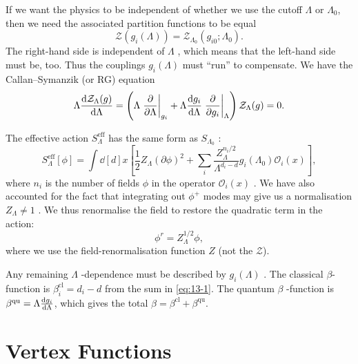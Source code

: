 If we want the physics to be independent of whether we use the cutoff $\Lambda$ or $\Lambda_0$, then we need the associated partition functions to be equal
\begin{equation}
  \mathcal{Z}(g_i (\Lambda)) = \mathcal{Z}_{\Lambda_0} (g_{i0}; \Lambda_0).
\end{equation}
The right-hand side is independent of $\Lambda$ , which means that the left-hand side must be, too.
Thus the couplings $g_i(\Lambda)$  must ``run'' to compensate.
We have the Callan--Symanzik (or RG) equation
\begin{equation}
  \Lambda \dv{\mathcal{Z}_\Lambda(g)}{\Lambda} = \left( \Lambda \left.\frac{\partial }{\partial \Lambda}\right\rvert_{g_i} + \Lambda \dv{g_i}{\Lambda} \left.\frac{\partial }{\partial g_i}\right\rvert_{\Lambda} \right) \mathcal{Z}_\Lambda (g) = 0.
\end{equation}

The effective action $S_\Lambda^{\text{eff}}$  has the same form as $S_{\Lambda_0}$ :
\begin{equation}
  \label{eq:13-1}
  S_\Lambda^{ \text{eff}} [\phi] = \int \dd[d]{x} \left[ \frac{1}{2} Z_\Lambda (\partial \phi)^2 + \sum_{i} \frac{Z_\Lambda^{n_i / 2}}{\Lambda^{d_i - d}} g_i(\Lambda_0) \mathcal{O}_i(x) \right],
\end{equation}
where $n_i$  is the number of fields $\phi$  in the operator $\mathcal{O}_i(x)$ .
We have also accounted for the fact that integrating out $\phi^+$ modes may give us a normalisation $Z_\Lambda \neq 1$ .  We thus renormalise the field to restore the quadratic term in the action:
\begin{equation}
  \phi^r = Z^{1 / 2}_\Lambda \phi,
\end{equation}
where we use the field-renormalisation function $Z$ (not the $\mathcal{Z}$).

Any remaining $\Lambda$ -dependence must be described by $g_i(\Lambda)$ .
The classical $\beta$-function is $\beta_i^{\text{cl}} = d_i - d$ from the sum in \eqref{eq:13-1}. The quantum $\beta$ -function is $\beta^{\text{qu}} = \Lambda \dv{g_i}{\Lambda}$, which gives the total $\beta = \beta^{\text{cl}} + \beta^{\text{qu}}$.

\section{Vertex Functions}%
\label{sec:ren:vertex_functions}

